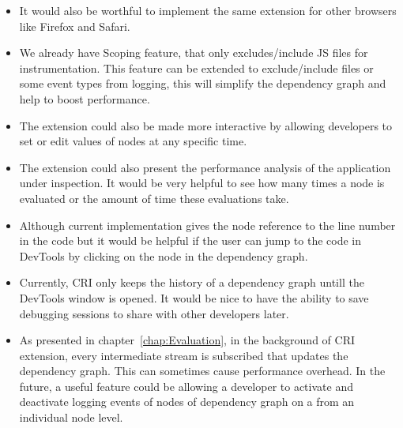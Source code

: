 \begin{itemize}
\item It would also be worthful to implement the same extension for other browsers like Firefox and Safari.

\item We already have Scoping feature, that only excludes/include JS files for instrumentation. This feature can be extended to exclude/include files or some event types from logging, this will simplify the dependency graph and help to boost performance.

\item The extension could also be made more interactive by allowing developers to set or edit values of nodes at any specific time. 

\item The extension could also present the performance analysis of the application under inspection. It would be very
helpful to see how many times a node is evaluated or the amount of time these evaluations take.

\item Although current implementation gives the node reference to the line number in the code but it would be helpful if the user can jump to the code in DevTools by clicking on the node in the dependency graph.	

\item Currently, CRI only keeps the history of a dependency graph untill the DevTools window is opened. It would be nice to have the ability to save debugging sessions to share with other developers later.

\item As presented in chapter~\ref{chap:Evaluation}, in the background of CRI extension, every intermediate stream is subscribed that updates the dependency graph. This can sometimes cause performance overhead. In the future, a useful feature could be allowing a developer to activate and deactivate logging events of nodes of dependency graph on a from an individual node level.

\end{itemize}
